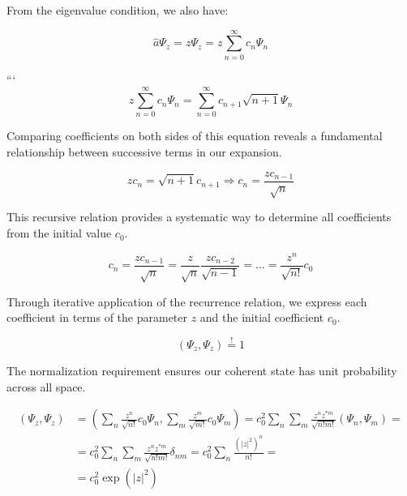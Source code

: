 \documentclass[italian]{HKNdocument}
\begin{document}
From the eigenvalue condition, we also have:

\begin{equation*}
\hat{a} \Psi_{z}=z \Psi_{z}=z \sum_{n=0}^{\infty} c_{n} \Psi_{n} \tag{7.81}
\end{equation*}

```
\begin{equation*}
z \sum_{n=0}^{\infty} c_{n} \Psi_{n}=\sum_{n=0}^{\infty} c_{n+1} \sqrt{n+1} \Psi_{n} \tag{7.82}
\end{equation*}

Comparing coefficients on both sides of this equation reveals a fundamental relationship between successive terms in our expansion.

\begin{equation*}
z c_{n}=\sqrt{n+1} c_{n+1} \Longrightarrow c_{n}=\frac{z c_{n-1}}{\sqrt{n}} \tag{7.83}
\end{equation*}

This recursive relation provides a systematic way to determine all coefficients from the initial value $c_0$.

\begin{equation*}
c_{n}=\frac{z c_{n-1}}{\sqrt{n}}=\frac{z}{\sqrt{n}} \frac{z c_{n-2}}{\sqrt{n-1}}=\ldots=\frac{z^{n}}{\sqrt{n!}} c_{0} \tag{7.84}
\end{equation*}

Through iterative application of the recurrence relation, we express each coefficient in terms of the parameter $z$ and the initial coefficient $c_0$.

\begin{equation*}
\left(\Psi_{z}, \Psi_{z}\right) \stackrel{!}{=} 1 \tag{7.85}
\end{equation*}

The normalization requirement ensures our coherent state has unit probability across all space.

\begin{align*}
\left(\Psi_{z}, \Psi_{z}\right) & =\left(\sum_{n} \frac{z^{n}}{\sqrt{n!}} c_{0} \Psi_{n}, \sum_{m} \frac{z^{m}}{\sqrt{m!}} c_{0} \Psi_{m}\right)=c_{0}^{2} \sum_{n} \sum_{m} \frac{z^{n} z^{* m}}{\sqrt{n!m!}}\left(\Psi_{n}, \Psi_{m}\right)= \\
& =c_{0}^{2} \sum_{n} \sum_{m} \frac{z^{n} z^{* m}}{\sqrt{n!m!}} \delta_{n m}=c_{0}^{2} \sum_{n} \frac{\left(|z|^{2}\right)^{n}}{n!}= \\
& =c_{0}^{2} \exp \left(|z|^{2}\right) \tag{7.86}
\end{align*}
\end{document}
